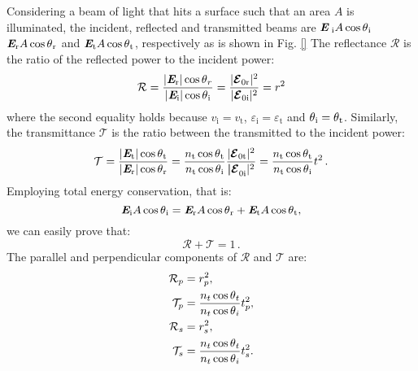 Considering a beam of light that hits a surface such that an area $A$ is illuminated, the incident, reflected and transmitted beams are 
$\textit{\textbf{E}}_\textrm{
i} A\cos\mbox{$\theta$}_\textrm{i}$ $\textit{\textbf{E}}_\textrm{r} A\cos\mbox{$\theta$}_\textrm{r}$ and 
$\textit{\textbf{E}}_\textrm{t} A\cos\mbox{$\theta$}_\textrm{t}$, respectively as is shown in Fig. \ref{}
The reflectance $\mathcal{R}$ is the ratio of the reflected power to the incident power:
\begin{equation}\label{reflectance}
\mathcal{R} = \frac{|\textit{\textbf{E}}_\textrm{r}|\cos\mbox{$\theta$}_r}{|\textit{\textbf{E}}_\textrm{i}|\cos\mbox{$\theta$}_\textrm{i}} = \frac{|\boldsymbol{\mathcal{E}}_{0 \textrm{r}}|^2}{|\boldsymbol{\mathcal{E}}_{0 \textrm{i}}|^2} = r^2
\end{equation}
where the second equality holds because $v_{\textrm{i}}= v_{\textrm{t}}$, $\varepsilon_{\textrm{i}} = \varepsilon_{\textrm{t}}$ and $\mbox{$\theta$}_{\textrm{i}} = \mbox{$\theta$}_{\textrm{t}}$.
Similarly, the transmittance $\mathcal{T}$ is the ratio between the transmitted to the incident power:
\begin{equation}\label{transmittance}
\mathcal{T} = \frac{|\textit{\textbf{E}}_\textrm{t}| \cos\mbox{$\theta$}_\textrm{t}}{|\textit{\textbf{E}}_\textrm{r}|\cos\mbox{$\theta$}_\textrm{r}} = \frac{n_\textrm{t} \cos\mbox{$\theta$}_\textrm{t}}{n_\textrm{t} \cos\mbox{$\theta$}_\textrm{i}}\frac{|\boldsymbol{\mathcal{E}}_{0 \textrm{t}}|^2}{\boldsymbol{|\mathcal{E}}_{0 \textrm{i}}|^2} = \frac{n_\textrm{t} \cos\mbox{$\theta$}_\textrm{t}}{n_\textrm{t} \cos\mbox{$\theta$}_\textrm{i}} t^2\,.
\end{equation}
Employing total energy conservation, that is:
\begin{equation}
\textit{\textbf{E}}_\textrm{i} A\cos\mbox{$\theta$}_\textrm{i} = \textit{\textbf{E}}_\textrm{r} A\cos\mbox{$\theta$}_\textrm{r}+\textit{\textbf{E}}_\textrm{t} A\cos\mbox{$\theta$}_\textrm{t},
\end{equation}
we can easily prove that:
\begin{equation}
\mathcal{R}+\mathcal{T}=1\,.
\end{equation}
 The parallel and perpendicular components of $\mathcal{R}$ and $\mathcal{T}$ are:
\begin{equation}\label{Fresnel_pands}
\begin{split}
\mathcal{R}_p& =  {r_p^2},\\
\mathcal{T}_p &=  \frac{n_t \cos\mbox{$\theta$}_t}{n_t \cos\mbox{$\theta$}_i}t_p^2,\\
\mathcal{R}_s &=  r_s^2,\\
\mathcal{T}_s &= \frac{n_t \cos\mbox{$\theta$}_t}{n_t \cos\mbox{$\theta$}_i}t_s^2.\\
\end{split}
\end{equation}
